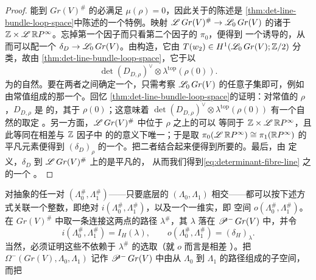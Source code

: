 \begin{proof}
能\trLift{}到 $Gr(V)^\#$ 的\trLoop{}必满足 $\mu(\rho)=0$，因此关于\trIndex{}的陈述是
\cref{thm:det-line-bundle-loop-space}中陈述的一个特例。映射
$\mathscr{L}\,Gr(V)^\#\to\mathscr{L}_0\,Gr(V)$ 的诸\trFiber{}\trHomotopyEquivalence{}于
$\mathbb{Z}\times\mathscr{L}\,\mathbb{R}P^\infty$。忘掉第一个因子而只看第二个因子的 $\pi_0$，便得到
一个诱导的\trDoubleCover，从而可以配一个\trRealLineBundle{}
$\delta_D\to\mathscr{L}_0\,Gr(V)$。由构造，它由
$T(w_2)\in H^1(\mathscr{L}_0\,Gr(V);\mathbb{Z}/2)$ 分类，故由
\cref{thm:det-line-bundle-loop-space}，它\trIsomorphic{}于以
\begin{equation}\label{eq:determinant-fibre-line}
\det(D_{D,\rho})^\vee\otimes\lambda^{\mathrm{top}}(\rho(0)).
\end{equation}
为\trFiber{}的自然\trLineBundle。要在两者之间确定一个\trIsomorphism，只需考察
$\mathscr{L}_0\,Gr(V)$ 的任意\trConnected{}子集即可，例如由常值\trLoop{}组成的那一个。回忆
\cref{thm:det-line-bundle-loop-space}的证明：对常值的 $\rho$，$D_{D,\rho}$ 是%
\trSurjective{}的，其\trKernel{}\trIsomorphic{}于 $\rho(0)$；这意味着
$\det(D_{D,\rho})^\vee\otimes\lambda^{\mathrm{top}}(\rho(0))$ 有一个自然的取定%
\trOrientation。另一方面，$\mathscr{L}\,Gr(V)^\#$ 中位于 $\rho$ 之上的\trFiber{}可以
等同于 $\mathbb{Z}\times\mathscr{L}\,\mathbb{R}P^\infty$，且此等同在相差\trHomotopy{}与 $\mathbb{Z}$ 因子中
的\trTranslation{}的意义下唯一；于是取
$\pi_0(\mathscr{L}\,\mathbb{R}P^\infty)\cong\pi_1(\mathbb{R}P^\infty)$ 的平凡元素便得到 $(\delta_D)_\rho$
的一个\trOrientation。把二者结合起来便得到所要的\trLineBundle{}\trIsomorphism。最后，由
定义，$\delta_D$ 到 $\mathscr{L}\,Gr(V)^\#$ 上的\trPullback{}是\trCanonical{}平凡的，
从而我们得到\eqref{eq:determinant-fibre-line} 之\trPullback{}的一个%
\trTrivialization。
\end{proof}
对抽象\trLinear\trLagrange\trBrane{}的任一对
$(\Lambda_0^\#,\Lambda_1^\#)$——只要底层的 $(\Lambda_0,\Lambda_1)$
\trTransverse{}相交——都可以按下述方式关联一个整数，即绝对\trIndex{}
$i(\Lambda_0^\#,\Lambda_1^\#)$，以及一个一维实\trVectorSpace，即\trOrientation{}
空间 $o(\Lambda_0^\#,\Lambda_1^\#)$。在 $Gr(V)^\#$ 中取一条连接这两点的路径
$\lambda^\#$，其\trProjection{} $\lambda$ 落在 $\mathscr{P}^-\,Gr(V)$ 中，并令
\begin{equation}\label{eq:absolute-index-orientation-space}
i(\Lambda_0^\#,\Lambda_1^\#)=I_H(\lambda),\qquad
o(\Lambda_0^\#,\Lambda_1^\#)=(\delta_H)_\lambda.
\end{equation}
当然，必须证明这些不依赖于 $\lambda^\#$ 的选取（就 $o$ 而言是相差%
\trCanonical\trIsomorphism）。把 $\Omega^-(Gr(V),\Lambda_0,\Lambda_1)$ 记作
$\mathscr{P}^-\,Gr(V)$ 中由从 $\Lambda_0$ 到 $\Lambda_1$ 的路径组成的子空间，而把
